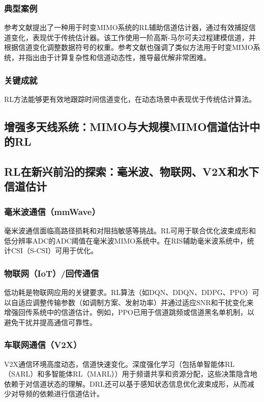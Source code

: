 \documentclass[journal]{IEEEtran}
\begin{document}
\subsubsection{典型案例}
参考文献\cite{ref12}提出了一种用于时变MIMO系统的RL辅助信道估计器，通过有效捕捉信道变化，表现优于传统估计器。该工作使用一阶高斯-马尔可夫过程建模信道，并根据信道变化调整数据符号的权重。参考文献\cite{ref14}也强调了类似方法用于时变MIMO系统，并指出由于计算复杂性和信道动态性，推导最优解非常困难。

\subsubsection{关键成就}
RL方法能够更有效地跟踪时间信道变化，在动态场景中表现优于传统估计算法\cite{ref12}。

\subsection{增强多天线系统：MIMO与大规模MIMO信道估计中的RL}

\subsection{RL在新兴前沿的探索：毫米波、物联网、V2X和水下信道估计}

\subsubsection{毫米波通信（mmWave）}
毫米波通信面临高路径损耗和对阻挡敏感等挑战。RL可用于联合优化波束成形和低分辨率ADC的ADC阈值在毫米波MIMO系统中\cite{ref34}。在RIS辅助毫米波系统中，统计CSI（S-CSI）可用于优化\cite{ref35}。

\subsubsection{物联网（IoT）/回传通信}
低功耗是物联网应用的关键要求。RL算法（如DQN、DDQN、DDPG、PPO）可以自适应调整传输参数（如调制方案、发射功率）并通过适应SNR和干扰变化来增强回传系统中的信道估计\cite{ref19}。例如，PPO已用于信道跳频或信道黑名单机制，以避免干扰并提高通信可靠性\cite{ref26}。

\subsubsection{车联网通信（V2X）}
V2X通信环境高度动态，信道快速变化。深度强化学习（包括单智能体RL（SARL）和多智能体RL（MARL））用于频谱共享和资源分配，这些决策隐含地依赖于对信道状态的理解\cite{ref9}。DRL还可以基于感知状态信息优化波束成形，从而减少对导频的依赖进行信道估计\cite{ref39}。
\end{document}
